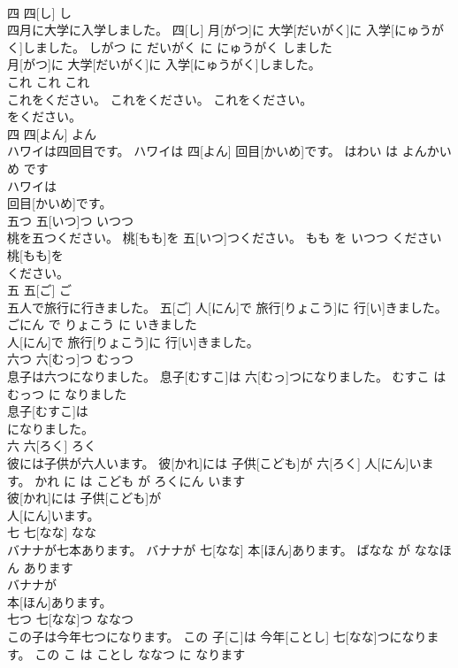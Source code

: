\documentclass[8pt]{extreport}
\begin{document}
\begin{CJK}{UTF8}{min}
\\	四	四[し]	し	
\\	四月に大学に入学しました。	四[し] 月[がつ]に 大学[だいがく]に 入学[にゅうがく]しました。	しがつ に だいがく に にゅうがく しました	
\\	月[がつ]に 大学[だいがく]に 入学[にゅうがく]しました。		
\\	これ	これ	これ	
\\	これをください。	これをください。	これをください。	
\\	をください。		
\\	四	四[よん]	よん	
\\	ハワイは四回目です。	ハワイは 四[よん] 回目[かいめ]です。	はわい は よんかいめ です	
\\	ハワイは
\\	回目[かいめ]です。		
\\	五つ	五[いつ]つ	いつつ	
\\	桃を五つください。	桃[もも]を 五[いつ]つください。	もも を いつつ ください	
\\	桃[もも]を
\\	ください。		
\\	五	五[ご]	ご	
\\	五人で旅行に行きました。	五[ご] 人[にん]で 旅行[りょこう]に 行[い]きました。	ごにん で りょこう に いきました	
\\	人[にん]で 旅行[りょこう]に 行[い]きました。		
\\	六つ	六[むっ]つ	むっつ	
\\	息子は六つになりました。	息子[むすこ]は 六[むっ]つになりました。	むすこ は むっつ に なりました	
\\	息子[むすこ]は
\\	になりました。		
\\	六	六[ろく]	ろく	
\\	彼には子供が六人います。	彼[かれ]には 子供[こども]が 六[ろく] 人[にん]います。	かれ に は こども が ろくにん います	
\\	彼[かれ]には 子供[こども]が
\\	人[にん]います。		
\\	七	七[なな]	なな	
\\	バナナが七本あります。	バナナが 七[なな] 本[ほん]あります。	ばなな が ななほん あります	
\\	バナナが
\\	本[ほん]あります。		
\\	七つ	七[なな]つ	ななつ	
\\	この子は今年七つになります。	この 子[こ]は 今年[ことし] 七[なな]つになります。	この こ は ことし ななつ に なります	

\end{CJK}
\end{document}
